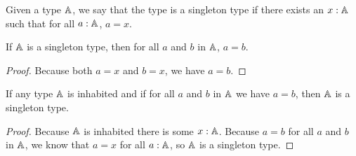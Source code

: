 \documentclass[../../math.tex]{subfiles}
\begin{document}
\begin{class}
    Given a type $\mathbb{A}$, we say that the type is a singleton type if there exists
    an $x : \mathbb{A}$ such that for all $a : \mathbb{A}$, $a = x$.
\end{class}

\begin{theorem}
    If $\mathbb{A}$ is a singleton type, then for all $a$ and $b$ in $\mathbb{A}$, $a = b$.
\end{theorem}
\begin{proof}
    Because both $a = x$ and $b = x$, we have $a = b$.
\end{proof}

\begin{theorem}
    If any type $\mathbb{A}$ is inhabited and if for all $a$ and $b$ in $\mathbb{A}$ we have $a
    = b$, then $\mathbb{A}$ is a singleton type.
\end{theorem}
\begin{proof}
    Because $\mathbb{A}$ is inhabited there is some $x : \mathbb{A}$.  Because $a = b$ for all
    $a$ and $b$ in $\mathbb{A}$, we know that $a = x$ for all $a : \mathbb{A}$, so $\mathbb{A}$ is a
    singleton type.
\end{proof}
\end{document}
